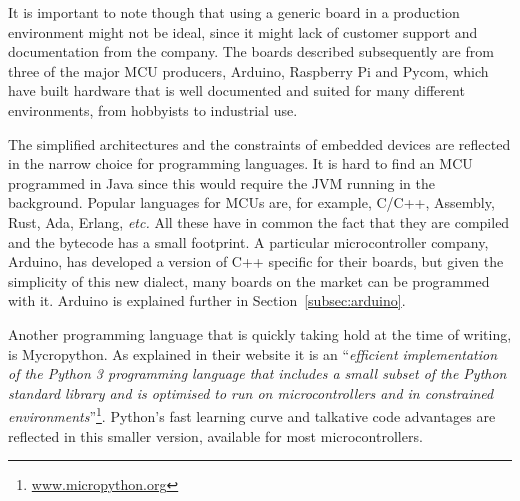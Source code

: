		It is important to note though that using a generic board in a production environment might not be ideal, since it might lack of customer support and documentation from the company.
		The boards described subsequently are from three of the major MCU producers, Arduino, Raspberry Pi and Pycom, which have built hardware that is well documented and suited for many different environments, from hobbyists to industrial use.
		
		The simplified architectures and the constraints of embedded devices are reflected in the narrow choice for programming languages.
		It is hard to find an MCU programmed in Java since this would require the JVM running in the background.
		Popular languages for MCUs are, for example, C/C++, Assembly, Rust, Ada, Erlang, \textit{etc.}
		All these have in common the fact that they are compiled and the bytecode has a small footprint.
		A particular microcontroller company, Arduino, has developed a version of C++ specific for their boards, but given the simplicity of this new dialect, many boards on the market can be programmed with it.
		Arduino is explained further in Section~\ref{subsec:arduino}.
	
		Another programming language that is quickly taking hold at the time of writing, is Mycropython.
		As explained in their website it is an ``\textit{efficient implementation of the Python 3 programming language that includes a small subset of the Python standard library and is optimised to run on microcontrollers and in constrained environments}''\footnote{ \url{www.micropython.org}}.
		Python's fast learning curve and talkative code advantages are reflected in this smaller version, available for most microcontrollers.
		
	
